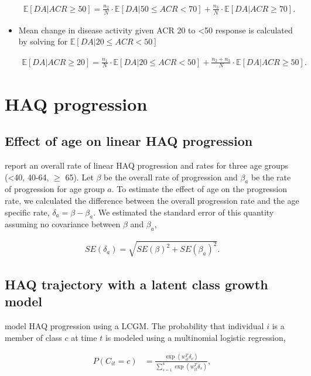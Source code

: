 \documentclass[11pt,final,fleqn]{article}
\theoremstyle{plain}
\newcommand\E{\mathbb{E}}
\begin{document}
\begin{appendices}
\begin{itemize}
\begin{align}
\E[DA|ACR \geq 50] = \frac{n_2}{N} \cdot \E[DA|50 \leq ACR < 70]  + \frac{n_3}{N} \cdot \E[DA|ACR \geq 70].
\end{align}

\item Mean change in disease activity given ACR 20 to <50 response is calculated by solving for $\E[DA|20 \leq ACR < 50]$

\begin{align}
\E[DA|ACR \geq 20] = \frac{n_1}{N} \cdot \E[DA|20 \leq ACR < 50]  + \frac{n_2 + n_3}{N} \cdot \E[DA|ACR \geq 50].
\end{align}

\end{itemize}

\section{HAQ progression}\label{app:haq-progression}
\subsection{Effect of age on linear HAQ progression}\label{app:age-linear-haq}
\citet{michaud2011treatment} report an overall rate of linear HAQ progression and rates for three age groups (<40, 40-64, $\geq$ 65). Let $\beta$ be the overall rate of progression and $\beta_a$ be the rate of progression for age group $a$. To estimate the effect of age on the progression rate, we calculated the difference between the overall progression rate and the age specific rate, $\delta_a = \beta - \beta_a$. We estimated the standard error of this quantity assuming no covariance between $\beta$ and $\beta_a$,

\begin{align}
SE(\delta_a) = \sqrt{SE(\beta)^2 + SE(\beta_a)^2}.
\end{align}


\subsection{HAQ trajectory with a latent class growth model}\label{app:lcgm-haq}
\citet{norton2014health} model HAQ progression using a LCGM. The probability that individual $i$ is a member of class $c$ at time $t$ is modeled using a multinomial logistic regression,

\begin{align}
P(C_{it} = c) &= \frac{\exp(w_{it}^T\delta_c)}{\sum_{s=1}^{4}\exp(w_{it}^T\delta_s)},
\end{align}


\end{appendices}
\end{document}
